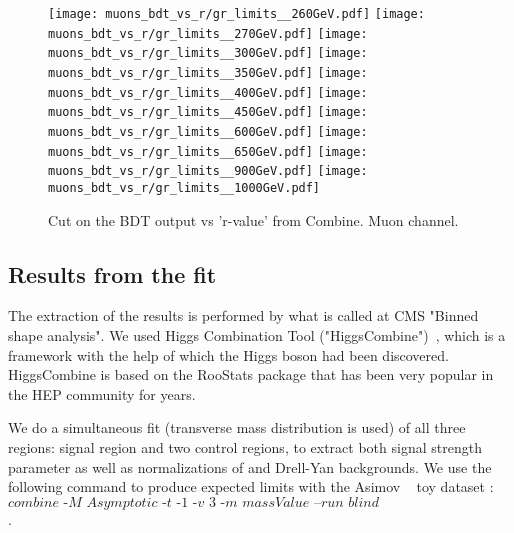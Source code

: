 \begin{figure}[!htb]%
\texttt{[image: muons\_bdt\_vs\_r/gr\_limits\_\_260GeV.pdf]}
\texttt{[image: muons\_bdt\_vs\_r/gr\_limits\_\_270GeV.pdf]}
\texttt{[image: muons\_bdt\_vs\_r/gr\_limits\_\_300GeV.pdf]}
\texttt{[image: muons\_bdt\_vs\_r/gr\_limits\_\_350GeV.pdf]}
\texttt{[image: muons\_bdt\_vs\_r/gr\_limits\_\_400GeV.pdf]}
\texttt{[image: muons\_bdt\_vs\_r/gr\_limits\_\_450GeV.pdf]}
\texttt{[image: muons\_bdt\_vs\_r/gr\_limits\_\_600GeV.pdf]}
\texttt{[image: muons\_bdt\_vs\_r/gr\_limits\_\_650GeV.pdf]}
\texttt{[image: muons\_bdt\_vs\_r/gr\_limits\_\_900GeV.pdf]}
\hspace{1.9cm}
\texttt{[image: muons\_bdt\_vs\_r/gr\_limits\_\_1000GeV.pdf]}
\caption{ Cut on the BDT output vs 'r-value' from Combine. Muon channel.}
\label{fig:muon_bdt_vs_r}           
\end{figure}

 
\subsection{Results from the fit}


The extraction of the results is performed by what is called at CMS "Binned shape analysis". We used Higgs Combination Tool ("HiggsCombine")~\cite{HiggsCombine}, which is a framework with the help of which the Higgs boson had been discovered. HiggsCombine is based on the RooStats package that has been very popular in the HEP community for years. 

We do a simultaneous fit (\mTHH transverse mass distribution is used) of all three
regions: signal region and two control regions, to extract both
signal strength parameter as well as normalizations of \ttbar and
Drell-Yan backgrounds. We use the following command to produce expected limits with the Asimov ~\cite{Cowan:2010js} toy dataset :  \hfill \break
$\textit{combine 
-M Asymptotic -t -1 -v 3 -m massValue --run blind
comb\_card\_massValue.txt}$.





